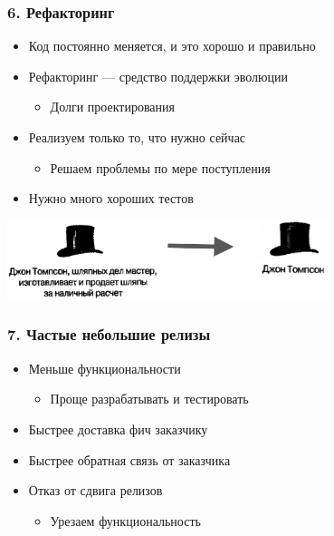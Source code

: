 \documentclass{../../slides-style}
\begin{document}
    \begin{frame}
        \frametitle{6. Рефакторинг}
        \begin{itemize}
            \item Код постоянно меняется, и это хорошо и правильно
            \item Рефакторинг --- средство поддержки эволюции
            \begin{itemize}
                \item Долги проектирования
            \end{itemize}
            \item Реализуем только то, что нужно сейчас
            \begin{itemize}
                \item Решаем проблемы по мере поступления
            \end{itemize}
            \item Нужно много хороших тестов
        \end{itemize}
        \begin{center}
            \includegraphics[width=0.7\textwidth]{hatsRefactoring.png}
        \end{center}
    \end{frame}

    \begin{frame}
        \frametitle{7. Частые небольшие релизы}
        \begin{itemize}
            \item Меньше функциональности
            \begin{itemize}
                \item Проще разрабатывать и тестировать
            \end{itemize}
            \item Быстрее доставка фич заказчику
            \item Быстрее обратная связь от заказчика
            \item Отказ от сдвига релизов
            \begin{itemize}
                \item Урезаем функциональность
            \end{itemize}
        \end{itemize}
    \end{frame}
\end{document}
